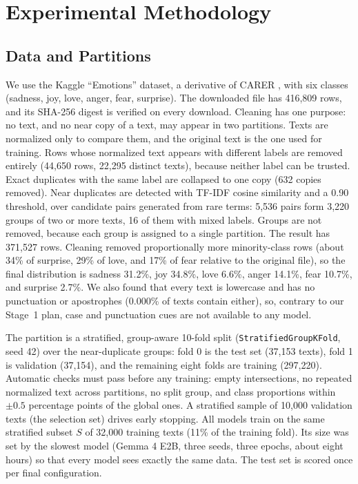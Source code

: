 
\section{Experimental Methodology}
\label{sec:method2}

\subsection{Data and Partitions}
We use the Kaggle ``Emotions'' dataset, a derivative of CARER \cite{saravia2018carer}, with six classes (sadness, joy, love, anger, fear, surprise). The downloaded file has 416,809 rows, and its SHA-256 digest is verified on every download. Cleaning has one purpose: no text, and no near copy of a text, may appear in two partitions. Texts are normalized only to compare them, and the original text is the one used for training. Rows whose normalized text appears with different labels are removed entirely (44,650 rows, 22,295 distinct texts), because neither label can be trusted. Exact duplicates with the same label are collapsed to one copy (632 copies removed). Near duplicates are detected with TF-IDF cosine similarity and a 0.90 threshold, over candidate pairs generated from rare terms: 5,536 pairs form 3,220 groups of two or more texts, 16 of them with mixed labels. Groups are not removed, because each group is assigned to a single partition. The result has 371,527 rows. Cleaning removed proportionally more minority-class rows (about 34\% of surprise, 29\% of love, and 17\% of fear relative to the original file), so the final distribution is sadness 31.2\%, joy 34.8\%, love 6.6\%, anger 14.1\%, fear 10.7\%, and surprise 2.7\%. We also found that every text is lowercase and has no punctuation or apostrophes (0.000\% of texts contain either), so, contrary to our Stage~1 plan, case and punctuation cues are not available to any model.

The partition is a stratified, group-aware 10-fold split (\texttt{StratifiedGroupKFold}, seed 42) over the near-duplicate groups: fold 0 is the test set (37,153 texts), fold 1 is validation (37,154), and the remaining eight folds are training (297,220). Automatic checks must pass before any training: empty intersections, no repeated normalized text across partitions, no split group, and class proportions within $\pm 0.5$ percentage points of the global ones. A stratified sample of 10,000 validation texts (the selection set) drives early stopping. All models train on the same stratified subset $S$ of 32,000 training texts (11\% of the training fold). Its size was set by the slowest model (Gemma 4 E2B, three seeds, three epochs, about eight hours) so that every model sees exactly the same data. The test set is scored once per final configuration.

